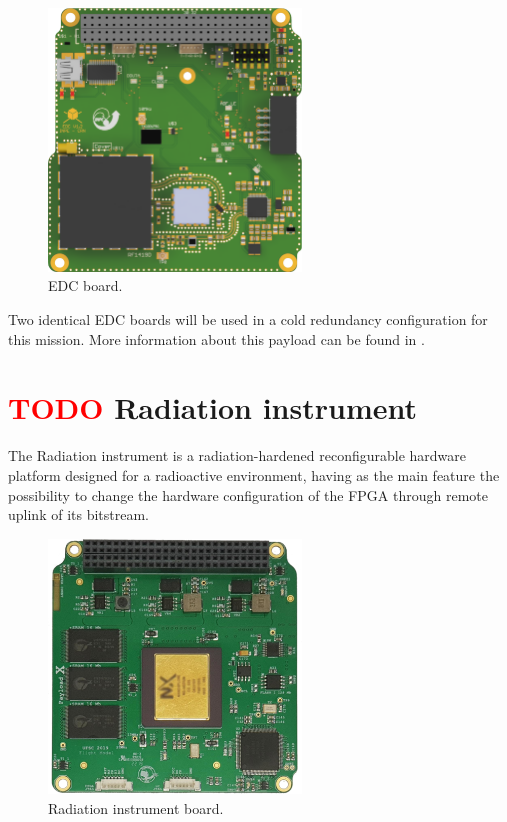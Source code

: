 \begin{figure}[!ht]
    \begin{center}
        \includegraphics[width=0.6\textwidth]{figures/subsystems/edc-pcb-top}
        \caption{EDC board.}
        \label{fig:edc-board}
    \end{center}
\end{figure}

Two identical EDC boards will be used in a cold redundancy configuration for this mission. More information about this payload can be found in \cite{edc}.

\section{ \textcolor{red}{TODO} Radiation instrument}

The Radiation instrument is a radiation-hardened reconfigurable hardware platform designed for a radioactive environment, having as the main feature the possibility to change the hardware configuration of the FPGA through remote uplink of its bitstream.

\begin{figure}[!ht]
    \begin{center}
        \includegraphics[width=0.6\textwidth]{figures/subsystems/payload-x-board}
        \caption{Radiation instrument board.}
        \label{fig:payload-x-board}
    \end{center}
\end{figure}

